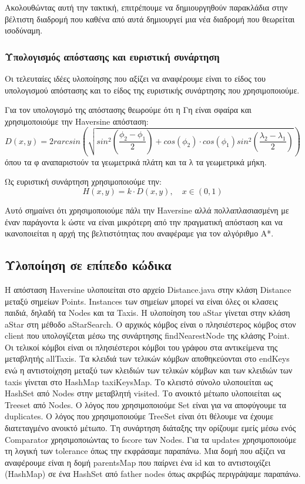 \documentclass[a4paper,oneside, 11pt]{article}
\begin{document}
Ακολουθώντας αυτή την τακτική, επιτρέπουμε να δημιουργηθούν παρακλάδια στην βέλτιστη διαδρομή που καθένα από αυτά δημιουργεί μια νέα διαδρομή που θεωρείται ισοδύναμη.


\subsubsection{Υπολογισμός απόστασης και ευριστική συνάρτηση}
Οι τελευταίες ιδέες υλοποίησης που αξίζει να αναφέρουμε είναι το είδος του υπολογισμού απόστασης και το είδος της ευριστικής συνάρτησης που χρησιμοποιούμε. \bigbreak 

Για τον υπολογισμό της απόστασης θεωρούμε ότι η Γη είναι σφαίρα και χρησιμοποιούμε την Haversine απόσταση:
$$
D(x, y) =  2 r arcsin\left( \sqrt{  sin^2(\frac{\phi_2 - \phi_1}{2}) + cos(\phi_2)\cdot cos(\phi_1)sin^2(\frac{\lambda_2 - \lambda_1}{2} )        }\right)
$$
όπου τα φ αναπαριστούν τα γεωμετρικά πλάτη και τα λ τα γεωμετρικά μήκη. \bigbreak 

Ως ευριστική συνάρτηση χρησιμοποιούμε την: 
$$
H(x, y) = k \cdot D(x,y), \quad x \in (0, 1)
$$

Αυτό σημαίνει ότι χρησιμοποιούμε πάλι την Haversine αλλά πολλαπλασιασμένη με έναν παράγοντα k ώστε να είναι μικρότερη από την πραγματική απόσταση και να ικανοποιείται η αρχή της βελτιστότητας που αναφέραμε για τον αλγόριθμο A*.


\subsection{Υλοποίηση σε επίπεδο κώδικα}
Η απόσταση Haversine υλοποιείται στο αρχείο Distance.java στην κλάση Distance μεταξύ σημείων Points. Instances των σημείων μπορεί να είναι όλες οι κλασεις παιδιά, δηλαδή τα Nodes και τα Taxis. Η υλοποίηση του aStar γίνεται στην κλάση aStar στη μέθοδο aStarSearch. Ο αρχικός κόμβος είναι ο πλησιέστερος κόμβος στον client που υπολογίζεται μέσω της συνάρτησης findNearestNode της κλάσης Point. Οι τελικοί κόμβοι είναι οι πλησιέστεροι κόμβοι του γράφου στα αντικείμενα της μεταβλητής allTaxis. Τα κλειδιά των τελικών κόμβων αποθηκεύονται στο endKeys ενώ η αντιστοίχηση μεταξύ των κλειδιών των τελικών κόμβων και των κλειδιών των taxis γίνεται στο HashMap taxiKeysMap. Το κλειστό σύνολο υλοποιείται ως HashSet από Nodes στην μεταβλητή visited. Το ανοικτό μέτωπο υλοποιείται ως Treeset από Nodes. Ο λόγος που χρησιμοποιούμε Set είναι για να αποφύγουμε τα duplicates. Ο λόγος που χρησιμοποιούμε TreeSet είναι ότι θέλουμε να έχουμε διατεταγμένο ανοικτό μέτωπο. Τη συνάρτηση διάταξης την ορίζουμε εμείς μέσω ενός Comparator χρησιμοποιώντας το fscore των Nodes. Για τα updates χρησιμοποιούμε τη λογική των tolerance όπως την εκφράσαμε παραπάνω. Μια δομή που αξίζει να αναφέρουμε είναι η δομή parentsMap που παίρνει ένα id και το αντιστοιχίζει (HashMap) σε ένα HashSet από father nodes όπως ακριβώς περιγράψαμε παραπάνω.  \bigbreak 
\end{document}
